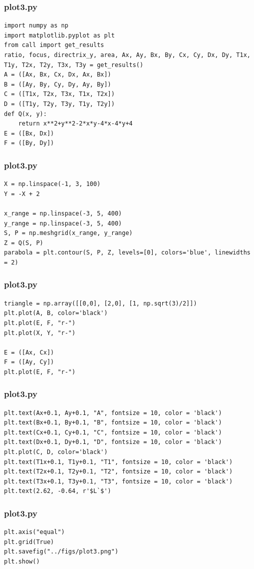 \documentclass{beamer}
\begin{document}
\begin{frame}[fragile]
    \frametitle{plot3.py}
    \begin{lstlisting}
import numpy as np
import matplotlib.pyplot as plt
from call import get_results
ratio, focus, directrix_y, area, Ax, Ay, Bx, By, Cx, Cy, Dx, Dy, T1x, T1y, T2x, T2y, T3x, T3y = get_results()
A = ([Ax, Bx, Cx, Dx, Ax, Bx])
B = ([Ay, By, Cy, Dy, Ay, By])
C = ([T1x, T2x, T3x, T1x, T2x])
D = ([T1y, T2y, T3y, T1y, T2y])
def Q(x, y):
    return x**2+y**2-2*x*y-4*x-4*y+4
E = ([Bx, Dx])
F = ([By, Dy])
    \end{lstlisting}
\end{frame}

\begin{frame}[fragile]
    \frametitle{plot3.py}
    \begin{lstlisting}
X = np.linspace(-1, 3, 100)
Y = -X + 2

x_range = np.linspace(-3, 5, 400)
y_range = np.linspace(-3, 5, 400)
S, P = np.meshgrid(x_range, y_range)
Z = Q(S, P)
parabola = plt.contour(S, P, Z, levels=[0], colors='blue', linewidths = 2)
    \end{lstlisting}
\end{frame}

\begin{frame}[fragile]
    \frametitle{plot3.py}
    \begin{lstlisting}
triangle = np.array([[0,0], [2,0], [1, np.sqrt(3)/2]])
plt.plot(A, B, color='black')
plt.plot(E, F, "r-")
plt.plot(X, Y, "r-")

E = ([Ax, Cx])
F = ([Ay, Cy])
plt.plot(E, F, "r-")
    \end{lstlisting}
\end{frame}

\begin{frame}[fragile]
    \frametitle{plot3.py}
    \begin{lstlisting}
plt.text(Ax+0.1, Ay+0.1, "A", fontsize = 10, color = 'black')
plt.text(Bx+0.1, By+0.1, "B", fontsize = 10, color = 'black')
plt.text(Cx+0.1, Cy+0.1, "C", fontsize = 10, color = 'black')
plt.text(Dx+0.1, Dy+0.1, "D", fontsize = 10, color = 'black')
plt.plot(C, D, color='black') 
plt.text(T1x+0.1, T1y+0.1, "T1", fontsize = 10, color = 'black')
plt.text(T2x+0.1, T2y+0.1, "T2", fontsize = 10, color = 'black')
plt.text(T3x+0.1, T3y+0.1, "T3", fontsize = 10, color = 'black')
plt.text(2.62, -0.64, r'$L`$')
    \end{lstlisting}
\end{frame}

\begin{frame}[fragile]
    \frametitle{plot3.py}
    \begin{lstlisting}
plt.axis("equal")
plt.grid(True)
plt.savefig("../figs/plot3.png")
plt.show()
    \end{lstlisting}
\end{frame}
\end{document}
